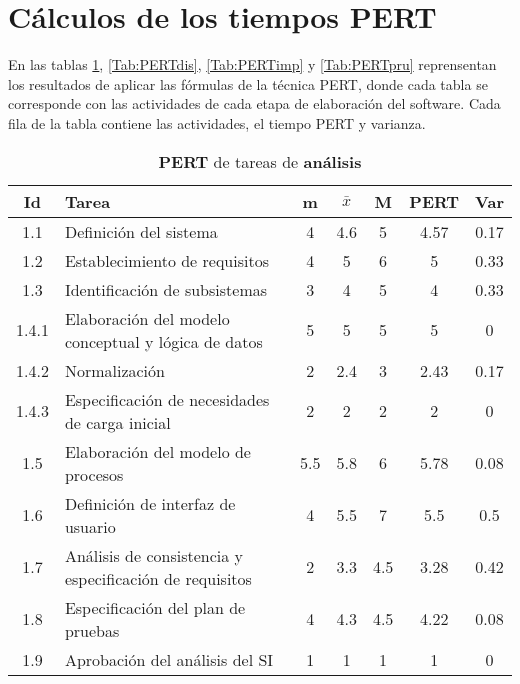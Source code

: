 \documentclass[11pt,a4paper,spanish,twoside]{report}
\begin{document}
\section{Cálculos de los tiempos PERT}
En las tablas \ref{Tab:PERTana}, \ref{Tab:PERTdis}, \ref{Tab:PERTimp} y
\ref{Tab:PERTpru} reprensentan los resultados de aplicar las fórmulas de la
técnica PERT, donde cada tabla se corresponde con las actividades de cada
etapa de elaboración del software. Cada fila de la tabla contiene las
actividades, el tiempo PERT y varianza.

\begin{table}[!h]
  \centering
  \begin{tabular}{|c||p{5.3cm}||c|c|c||c|c|}
    \hline
    \textbf{Id} & \textbf{Tarea} & \textbf{m} & 
    \textbf{$\bar{x}$} &\textbf{M} & \textbf{PERT} & \textbf{Var}\\
    \hline \hline
    1.1 & Definición del sistema & 4 & 4.6 & 5 & 4.57 & 0.17\\ 
    \hline
    1.2 & Establecimiento de requisitos & 4 & 5 & 6 & 5 & 0.33\\
    \hline 
    1.3 & Identificación de subsistemas & 3 & 4 & 5 & 4 & 0.33\\
    \hline
    1.4.1 & Elaboración del modelo conceptual y lógica de datos & 5 & 5 & 5 &
    5 & 0\\
    \hline
    1.4.2 & Normalización & 2 & 2.4 & 3 & 2.43 & 0.17\\
    \hline
    1.4.3 & Especificación de necesidades de carga inicial & 2 & 2 & 2 & 2 & 0\\
    \hline
    1.5 & Elaboración del modelo de procesos & 5.5 & 5.8 & 6 & 5.78 & 0.08\\
    \hline
    1.6 & Definición de interfaz de usuario & 4 & 5.5 & 7 & 5.5 & 0.5\\
    \hline
    1.7 & Análisis de consistencia y especificación de requisitos & 2 & 3.3
    & 4.5 & 3.28 & 0.42\\
    \hline
    1.8 & Especificación del plan de pruebas & 4 & 4.3 & 4.5 & 4.22 & 0.08\\
    \hline
    1.9 & Aprobación del análisis del SI & 1 & 1 & 1 & 1 & 0\\
    \hline
  \end{tabular}
  \caption{\textbf{PERT} de tareas de \textbf{análisis}} 
  \label{Tab:PERTana}
\end{table}
\end{document}
